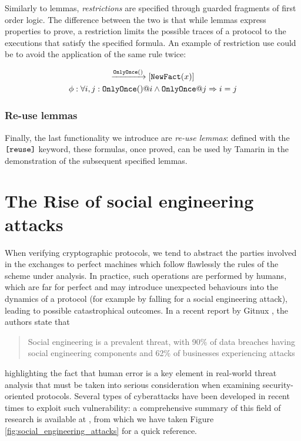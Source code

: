 \documentclass{article}
\newcommand{\mono}[1]{\textrm{\tt #1}}
\begin{document}
Similarly to lemmas, \textit{restrictions} are specified through guarded fragments of first order logic. The difference between the two is that while lemmas express properties to prove, a restriction limits the possible traces of a protocol to the executions that satisfy the specified formula. An example of restriction use could be to avoid the application of the same rule twice:

\begin{gather*}
    [\mono{OldFact}(x)] \xrightarrow{\mono{OnlyOnce}()} [\mono{NewFact}(x)]\\
    \phi : \forall i,j : \mono{OnlyOnce}() @ i \land \mono{OnlyOnce} @ j \Rightarrow i = j
\end{gather*}

\subsubsection{Re-use lemmas}

Finally, the last functionality we introduce are \textit{re-use lemmas}: defined with the $\mono{[reuse]}$ keyword, these formulas, once proved, can be used by Tamarin in the demonstration of the subsequent specified lemmas.





\section{The Rise of social engineering attacks}

When verifying cryptographic protocols, we tend to abstract the parties involved in the exchanges to perfect machines which follow flawlessly the rules of the scheme under analysis. In practice, such operations are performed by humans, which are far for perfect and may introduce unexpected behaviours into the dynamics of a protocol (for example by falling for a social engineering attack), leading to possible catastrophical outcomes. In a recent report by Gitnux \cite{Gitnux_2023}, the authors state that

\begin{quote} Social engineering is a prevalent threat, with 90\% of data breaches having social engineering components and 62\% of businesses experiencing attacks \end{quote}

highlighting the fact that human error is a key element in real-world threat analysis that must be taken into serious consideration when examining security-oriented protocols. Several types of cyberattacks have been developed in recent times to exploit such vulnerability: a comprehensive summary of this field of research is available at \cite{Salahdine_2019}, from which we have taken Figure \ref{fig:social_engineering_attacks} for a quick reference.
\end{document}

